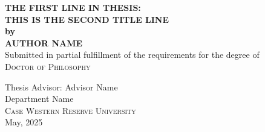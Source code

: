 \documentclass[12pt, oneside]{book}
\begin{document}


\begin{titlepage}
\begin{center}
\Large{\bfseries\MakeUppercase{
    The First Line in Thesis:\\ This is the Second Title Line\\
 }}
 \vspace{.5cm}
 \large{\bfseries{by}}\\ \vspace{.5cm}
 \vspace{.5cm}
\Large{\bfseries\MakeUppercase{Author Name}}\\[5pt]

\vspace{2cm}
\large{Submitted in partial fulfillment of the requirements for the degree of} \\[0.5cm]
\textsc{\Large{{Doctor of Philosophy}}} \\[5pt]
\vfill

{Thesis Advisor: Advisor Name} \vspace{0.4cm} \\[2cm]

 \vfill
\large{Department Name}\\[5pt]
\textsc{Case Western Reserve University}\\[0.5cm]

{May, 2025}
\end{center}
\end{titlepage}
\end{document}
